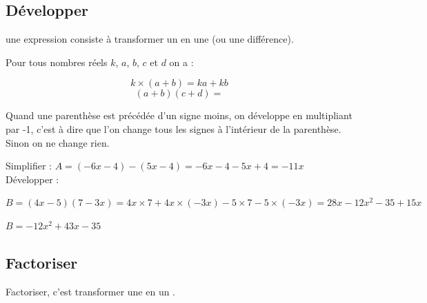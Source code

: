 \documentclass[11pt,a4paper]{book}
\begin{document}
\subsection{Développer}

\begin{bdefi}
	 une expression consiste à transformer un  en une  (ou une différence).
\end{bdefi}

\begin{bprop}
	
	
	Pour tous nombres réels $k$, $a$, $b$, $c$ et $d$ \quad on a :
	
	$$k\times (a+b)=ka+kb$$
	$$(a+b)(c+d)=$$
	
\end{bprop}
\begin{bmethode}
	Quand une parenthèse est précédée d'un signe moins, on développe en multipliant par -1, c'est à dire que l'on change tous les signes à l'intérieur de la parenthèse. Sinon on ne change rien. 
\end{bmethode}


\begin{bexemple}{}
	
	Simplifier :
	$A=\left(-6 x-4\right)-\left(5 x-4\right)=-6x-4-5x+4=-11x$ \\
	Développer : 
	
	$B=(4x- 5)(7-3x)=4x\times 7+4x\times (-3x)-5\times 7-5\times (-3x)=28x-12x^2-35+15x$
	
	$B=-12x^2+43x-35$
\end{bexemple}

\subsection{Factoriser}

\begin{bdefi}
	Factoriser, c'est transformer une  en un .\\
\end{bdefi}
\end{document}
